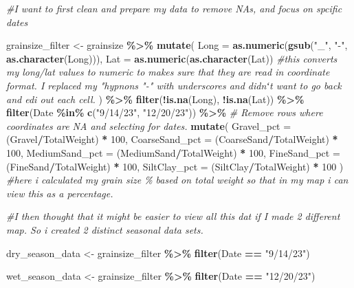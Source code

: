 \documentclass[
]{article}
\newenvironment{Shaded}{\begin{snugshade}}{\end{snugshade}}
\newcommand{\AttributeTok}[1]{\textcolor[rgb]{0.13,0.29,0.53}{#1}}
\newcommand{\CommentTok}[1]{\textcolor[rgb]{0.56,0.35,0.01}{\textit{#1}}}
\newcommand{\DecValTok}[1]{\textcolor[rgb]{0.00,0.00,0.81}{#1}}
\newcommand{\FunctionTok}[1]{\textcolor[rgb]{0.13,0.29,0.53}{\textbf{#1}}}
\newcommand{\NormalTok}[1]{#1}
\newcommand{\OtherTok}[1]{\textcolor[rgb]{0.56,0.35,0.01}{#1}}
\newcommand{\SpecialCharTok}[1]{\textcolor[rgb]{0.81,0.36,0.00}{\textbf{#1}}}
\newcommand{\StringTok}[1]{\textcolor[rgb]{0.31,0.60,0.02}{#1}}
\begin{document}
\begin{Shaded}
\begin{Highlighting}[]
\CommentTok{\#I want to first clean and prepare my data to remove NAs, and focus on spcific dates}

\NormalTok{grainsize\_filter }\OtherTok{\textless{}{-}}\NormalTok{ grainsize }\SpecialCharTok{\%\textgreater{}\%}
  \FunctionTok{mutate}\NormalTok{(}
    \AttributeTok{Long =} \FunctionTok{as.numeric}\NormalTok{(}\FunctionTok{gsub}\NormalTok{(}\StringTok{"\_"}\NormalTok{, }\StringTok{"{-}"}\NormalTok{, }\FunctionTok{as.character}\NormalTok{(Long))),}
    \AttributeTok{Lat =} \FunctionTok{as.numeric}\NormalTok{(}\FunctionTok{as.character}\NormalTok{(Lat)) }\CommentTok{\#this converts my long/lat values to numeric to makes sure that they are read in coordinate format. I replaced my "hypnons "{-}" with underscores and didnʻt want to go back and edi out each cell.}
\NormalTok{  ) }\SpecialCharTok{\%\textgreater{}\%}
  \FunctionTok{filter}\NormalTok{(}\SpecialCharTok{!}\FunctionTok{is.na}\NormalTok{(Long), }\SpecialCharTok{!}\FunctionTok{is.na}\NormalTok{(Lat)) }\SpecialCharTok{\%\textgreater{}\%}
  \FunctionTok{filter}\NormalTok{(Date }\SpecialCharTok{\%in\%} \FunctionTok{c}\NormalTok{(}\StringTok{"9/14/23"}\NormalTok{, }\StringTok{"12/20/23"}\NormalTok{)) }\SpecialCharTok{\%\textgreater{}\%} \CommentTok{\# Remove rows where coordinates are NA and selecting for dates. }
  \FunctionTok{mutate}\NormalTok{(}
    \AttributeTok{Gravel\_pct =}\NormalTok{ (Gravel}\SpecialCharTok{/}\NormalTok{TotalWeight) }\SpecialCharTok{*} \DecValTok{100}\NormalTok{,}
    \AttributeTok{CoarseSand\_pct =}\NormalTok{ (CoarseSand}\SpecialCharTok{/}\NormalTok{TotalWeight) }\SpecialCharTok{*} \DecValTok{100}\NormalTok{,}
    \AttributeTok{MediumSand\_pct =}\NormalTok{ (MediumSand}\SpecialCharTok{/}\NormalTok{TotalWeight) }\SpecialCharTok{*} \DecValTok{100}\NormalTok{,}
    \AttributeTok{FineSand\_pct =}\NormalTok{ (FineSand}\SpecialCharTok{/}\NormalTok{TotalWeight) }\SpecialCharTok{*} \DecValTok{100}\NormalTok{,}
    \AttributeTok{SiltClay\_pct =}\NormalTok{ (SiltClay}\SpecialCharTok{/}\NormalTok{TotalWeight) }\SpecialCharTok{*} \DecValTok{100}
\NormalTok{  )}
\CommentTok{\#here i calculated my grain size \% based on total weight so that in my map i can view this as a percentage.}


\CommentTok{\#I then thought that it might be easier to view all this dat if I made 2 different map. So i created 2 distinct seasonal data sets.}

\NormalTok{dry\_season\_data }\OtherTok{\textless{}{-}}\NormalTok{ grainsize\_filter }\SpecialCharTok{\%\textgreater{}\%} 
  \FunctionTok{filter}\NormalTok{(Date }\SpecialCharTok{==} \StringTok{"9/14/23"}\NormalTok{)}

\NormalTok{wet\_season\_data }\OtherTok{\textless{}{-}}\NormalTok{ grainsize\_filter }\SpecialCharTok{\%\textgreater{}\%} 
  \FunctionTok{filter}\NormalTok{(Date }\SpecialCharTok{==} \StringTok{"12/20/23"}\NormalTok{)}
\end{Highlighting}
\end{Shaded}
\end{document}
